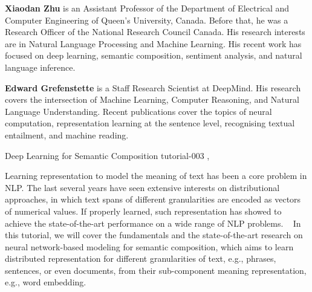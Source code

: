 \begin{bio}
  {\bfseries Xiaodan Zhu} is an Assistant Professor of the Department of Electrical and Computer Engineering of Queen’s University, Canada. Before that, he was a Research Officer of the National Research Council Canada. His research interests are in Natural Language Processing and Machine Learning. His recent work has focused on deep learning, semantic composition, sentiment analysis, and natural language inference.

  {\bfseries Edward Grefenstette} is a Staff Research Scientist at DeepMind. His research covers the intersection of Machine Learning, Computer Reasoning, and Natural Language Understanding. Recent publications cover the topics of neural computation, representation learning at the sentence level, recognising textual entailment, and machine reading. 
\end{bio}

\begin{tutorial}
  {Deep Learning for Semantic Composition}
  {tutorial-003}
  {\daydateyear, \tutorialmorningtime}
  {\TutLocC}

Learning representation to model the meaning of text has been a core problem in NLP. The last several years have seen extensive interests on distributional approaches, in which text spans of different granularities are encoded as vectors of numerical values. If properly learned, such representation has showed to achieve the state-of-the-art performance on a wide range of NLP problems.
 
In this tutorial, we will cover the fundamentals and the state-of-the-art research on neural network-based modeling for semantic composition, which aims to learn distributed representation for different granularities of text, e.g., phrases, sentences, or even documents, from their sub-component meaning representation, e.g., word embedding.
\end{tutorial}
